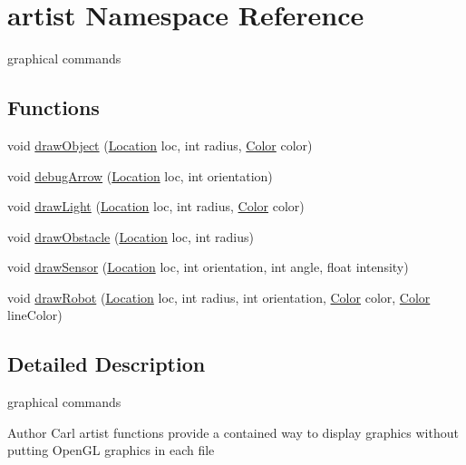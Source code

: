 \hypertarget{namespaceartist}{\section{artist Namespace Reference}
\label{namespaceartist}
}


graphical commands  


\subsection*{Functions}
\begin{DoxyCompactItemize}
\item 
void \hyperlink{namespaceartist_a1448f39368e6eb1c1c070aba00767141}{draw\-Object} (\hyperlink{structLocation}{Location} loc, int radius, \hyperlink{structColor}{Color} color)
\item 
void \hyperlink{namespaceartist_a078dbf47b29eb68f94c0fb4bcf075923}{debug\-Arrow} (\hyperlink{structLocation}{Location} loc, int orientation)
\item 
void \hyperlink{namespaceartist_a54b058b55aa1c86eade343d055a91abc}{draw\-Light} (\hyperlink{structLocation}{Location} loc, int radius, \hyperlink{structColor}{Color} color)
\item 
void \hyperlink{namespaceartist_acdb1a447e5436ee484f84c8dd64410ee}{draw\-Obstacle} (\hyperlink{structLocation}{Location} loc, int radius)
\item 
void \hyperlink{namespaceartist_a3396363108746338a9f8d0d3bf334c09}{draw\-Sensor} (\hyperlink{structLocation}{Location} loc, int orientation, int angle, float intensity)
\item 
void \hyperlink{namespaceartist_aa60b5844db3fb3073387b39ba19ea0ad}{draw\-Robot} (\hyperlink{structLocation}{Location} loc, int radius, int orientation, \hyperlink{structColor}{Color} color, \hyperlink{structColor}{Color} line\-Color)
\end{DoxyCompactItemize}


\subsection{Detailed Description}
graphical commands \begin{DoxyAuthor}{Author}
Carl artist functions provide a contained way to display graphics without putting Open\-G\-L graphics in each file 
\end{DoxyAuthor}


